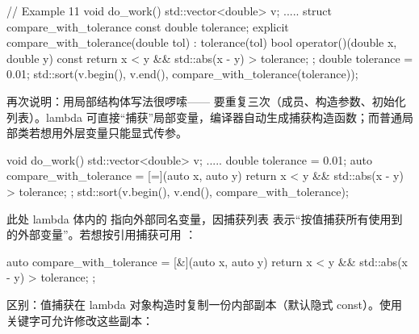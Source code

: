 \begin{code}
// Example 11
void do_work() {
  std::vector<double> v;
  .....
  struct compare_with_tolerance {
    const double tolerance;
    explicit compare_with_tolerance(double tol) :
      tolerance(tol) {}
    bool operator()(double x, double y) const {
      return x < y && std::abs(x - y) > tolerance;
    }
  };
  double tolerance = 0.01;
  std::sort(v.begin(), v.end(),
            compare_with_tolerance(tolerance));
}
\end{code}

再次说明：用局部结构体写法很啰嗦—— 要重复三次（成员、构造参数、初始化列表）。lambda 可直接“捕获”局部变量，编译器自动生成捕获构造函数；而普通局部类若想用外层变量只能显式传参。

\begin{code}
void do_work() {
  std::vector<double> v;
  .....
  double tolerance = 0.01;
  auto compare_with_tolerance = [=](auto x, auto y) {
    return x < y && std::abs(x - y) > tolerance;
  };
  std::sort(v.begin(), v.end(), compare_with_tolerance);
}
\end{code}

此处 lambda 体内的  指向外部同名变量，因捕获列表 \cii{[=]} 表示“按值捕获所有使用到的外部变量”。若想按引用捕获可用 \cii{[&]}：

\begin{code}
auto compare_with_tolerance = [&](auto x, auto y) {
  return x < y && std::abs(x - y) > tolerance;
};
\end{code}

区别：值捕获在 lambda 对象构造时复制一份内部副本（默认隐式 const）。使用  关键字可允许修改这些副本：

